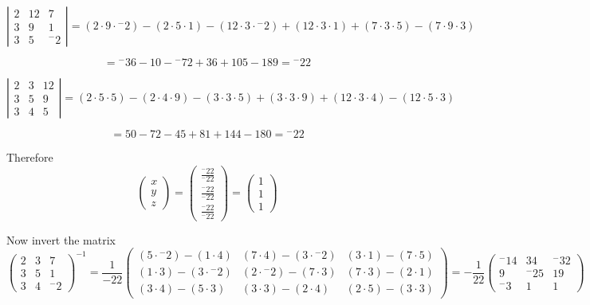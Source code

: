 \documentclass{article}
\def\cramersMatrix#1#2#3#4#5#6#7#8#9{
  \def\a{{#1}}
  \def\b{{#2}}
  \def\c{{#3}}
  \def\d{{#4}}
  \def\e{{#5}}
  \def\f{{#6}}
  \def\g{{#7}}
  \def\h{{#8}}
  \def\i{{#9}}
}
\newcommand{\determinant}[9]
{
\cramersMatrix{#1}{#2}{#3}{#4}{#5}{#6}{#7}{#8}{#9}
\[
	\left|
		\begin{array}{ccc}
			\a & \b & \c \\
			\d & \e & \f \\
			\g & \h & \i
		\end{array}
	\right|
	= (\a \cdot \e \cdot \i) - (\a \cdot \h \cdot \f) - (\b \cdot \d \cdot \i) + (\b \cdot \g \cdot \f) + (\c \cdot \d \cdot \h) - (\c \cdot \e \cdot \g)
\]
}
\begin{document}
\begin{enumerate}
\begin{enumerate}[i.]
\determinant{2}{12}{7}{3}{9}{1}{3}{5}{{^-}2}
\[
	= {^-}36 - 10 - {^-}72 + 36 + 105 - 189 = {^-}22
\]

\determinant{2}{3}{12}{3}{5}{9}{3}{4}{5}
\[
	= 50 - 72 - 45 + 81 + 144 - 180 = {^-}22
\]

Therefore
\[
	\left(
		\begin{array}{c}
			x \\
			y \\
			z
		\end{array}
	\right)
	=
	\left(
		\begin{array}{c}
			\frac{{^-}22}{{^-}22} \\
			\frac{{^-}22}{{^-}22} \\
			\frac{{^-}22}{{^-}22}
		\end{array}
	\right)
	=
	\left(
		\begin{array}{c}
			1 \\
			1 \\
			1
		\end{array}
	\right)
\]

Now invert the matrix
\[
	\left(
		\begin{array}{ccc}
			2 & 3 & 7 \\
			3 & 5 & 1 \\
			3 & 4 & {^-}2
		\end{array}
	\right)^{-1}
	=
	\frac{1}{-22}
	\left(
		\begin{array}{ccc}
			(5 \cdot {^-}2)-(1 \cdot 4) & (7 \cdot 4)-(3 \cdot {^-}2) & (3 \cdot 1)-(7 \cdot 5) \\
			(1 \cdot 3)-(3 \cdot {^-}2) & (2 \cdot {^-}2)-(7 \cdot 3) & (7 \cdot 3)-(2 \cdot 1) \\
			(3 \cdot 4)-(5 \cdot 3)        & (3 \cdot 3)-(2 \cdot 4)         & (2 \cdot 5)-(3 \cdot 3)
		\end{array}
	\right)
	=
	-\frac{1}{22}
	\left(
		\begin{array}{ccc}
		 {^-}14 &          34 &  {^-}32 \\
		           9 &  {^-}25 &         19  \\
 		    {^-}3 &           1 &           1
		\end{array}	
	\right)
\]


\end{enumerate}
\end{enumerate}
\end{document}
